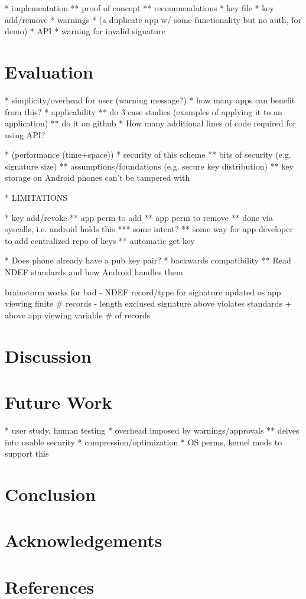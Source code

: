 \documentclass[12pt]{article}
\begin{document}
* implementation
** proof of concept
** recommendations
* key file
* key add/remove
* warnings
* (a duplicate app w/ some functionality but no auth, for demo)
* API
* warning for invalid signature

\section{Evaluation}
* simplicity/overhead for user (warning message?)
* how many apps can benefit from this?
* applicability
** do 3 case studies (examples of applying it to an application)
** do it on github
* How many additional lines of code required for using API?

* (performance (time+space))
* security of this scheme
** bits of security (e.g. signature size)
** assumptions/foundations (e.g. secure key distribution)
** key storage on Android phones can't be tampered with

* LIMITATIONS

* key add/revoke
** app perm to add
** app perm to remove
** done via syscalls, i.e. android holds this
*** some intent?
** some way for app developer to add centralized repo of keys
** automatic get key

* Does phone already have a pub key pair?
* backwards compatibility
** Read NDEF standards and how Android handles them

brainstorm                         works for                           bad
- NDEF record/type for signature   updated os
                                   app viewing finite \# records
- length exclused signature        above                               violates standards
  + above                          app viewing variable \# of records   

\section{Discussion}

\section{Future Work}
* user study, human testing
* overhead imposed by warnings/approvals
** delves into usable security
* compression/optimization
* OS perms, kernel mods to support this

\section{Conclusion}

\section{Acknowledgements}

\section{References}
\end{document}
